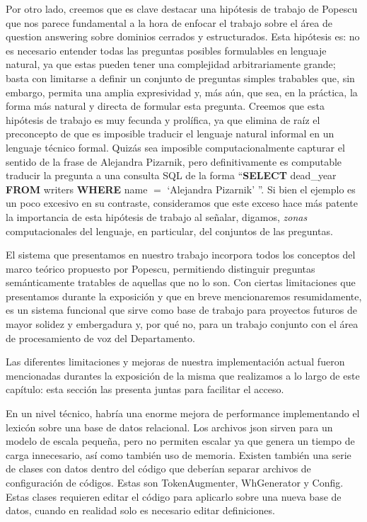 Por otro lado, creemos que es clave destacar una hipótesis de trabajo de Popescu que nos parece fundamental a la hora de enfocar el trabajo sobre el área de question answering sobre dominios cerrados y estructurados. Esta hipótesis es: no es necesario entender todas las preguntas posibles formulables en lenguaje natural, ya que estas pueden tener una complejidad arbitrariamente grande; basta con limitarse a definir un conjunto de preguntas simples trabables que, sin embargo, permita una amplia expresividad y, más aún, que sea, en la práctica, la forma más natural y directa de formular esta pregunta.
Creemos que esta hipótesis de trabajo es muy fecunda y prolífica, ya que elimina de raíz el preconcepto de que es imposible traducir el lenguaje natural informal en un lenguaje técnico formal. Quizás sea imposible computacionalmente capturar el sentido de la frase  de Alejandra Pizarnik, pero definitivamente es computable traducir la pregunta  a una consulta SQL de la forma ``\textbf{SELECT} dead\_year \textbf{FROM} writers \textbf{WHERE} name $=$ `Alejandra Pizarnik' ''. Si bien el ejemplo es un poco excesivo en su contraste, consideramos que este exceso hace más patente la importancia de esta hipótesis de trabajo al señalar, digamos, \textit{zonas} computacionales del lenguaje, en particular, del conjuntos de las preguntas.

El sistema que presentamos en nuestro trabajo incorpora todos los conceptos del marco teórico propuesto por Popescu, permitiendo distinguir preguntas semánticamente tratables de aquellas que no lo son. Con ciertas limitaciones que presentamos durante la exposición y que en breve mencionaremos resumidamente, es un sistema funcional que sirve como base de trabajo para proyectos futuros de mayor solidez y embergadura y, por qué no, para un trabajo conjunto con el área de procesamiento de voz del Departamento.

Las diferentes limitaciones y mejoras de nuestra implementación actual fueron mencionadas durantes la exposición de la misma que realizamos a lo largo de este capítulo: esta sección las presenta juntas para facilitar el acceso.

En un nivel técnico, habría una enorme mejora de performance implementando el lexicón sobre una base de datos relacional. Los archivos json sirven para un modelo de escala pequeña, pero no permiten escalar ya que genera un tiempo de carga innecesario, así como también uso de memoria. Existen también una serie de clases con datos dentro del código que deberían separar archivos de configuración de códigos. Estas son TokenAugmenter, WhGenerator y Config. Estas clases requieren editar el código para aplicarlo sobre una nueva base de datos, cuando en realidad solo es necesario editar definiciones.

